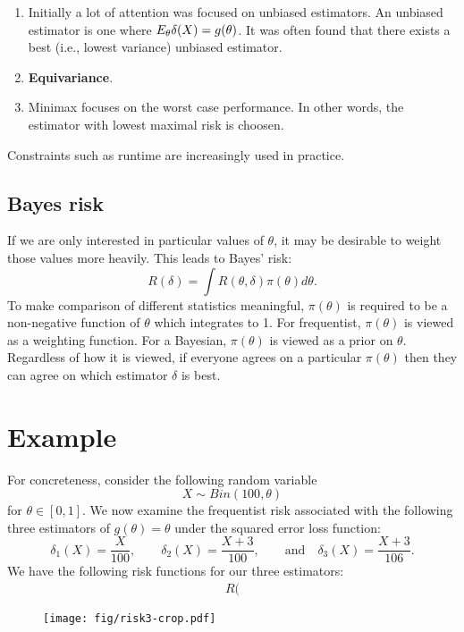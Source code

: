 \documentclass[twoside]{article}
\begin{document}
\begin{enumerate}
\item Initially a lot of attention was focused on unbiased estimators. An
  unbiased estimator is one where $E_{\theta}\delta(X) = g(\theta)$. It
  was often found that there exists a best (i.e., lowest variance) unbiased
  estimator.
\item \textbf{Equivariance}.
\item Minimax focuses on the worst case performance.  In other words, the estimator
   with lowest maximal risk is choosen.
\end{enumerate}

Constraints such as runtime are increasingly used in practice.

\subsection{Bayes risk}

If we are only interested in particular values of $\theta$, it may be desirable
to weight those values more heavily.  This leads to Bayes' risk:
\begin{equation}
R(\delta) = \int R(\theta, \delta) \pi(\theta) d\theta.
\end{equation}
To make comparison of different statistics meaningful, $\pi(\theta)$ is
required to be a non-negative function of $\theta$ which integrates to 1.  For
frequentist, $\pi(\theta)$ is viewed as a weighting function.  For a Bayesian,
$\pi(\theta)$ is viewed as a prior on $\theta$. Regardless of how it is viewed,
if everyone agrees on a particular $\pi(\theta)$ then they can agree on
which estimator $\delta$ is best.

\section{Example}

For concreteness, consider \citep[Example 3.1, p.~40-41]{keener} the following
random variable
\begin{equation*}
X \sim Bin(100, \theta)
\end{equation*}
for $\theta \in [0,1]$.  We now examine the frequentist risk associated with
the following three estimators of $g(\theta) = \theta$ under the squared error
loss function:
\begin{equation*}
\delta_1(X) = \frac{X}{100}, \qquad \delta_2(X) = \frac{X+3}{100},
              \qquad \text{and} \quad \delta_3(X) = \frac{X+3}{106}.
\end{equation*}
We have the following risk functions for our three estimators:
\begin{align*}
R(
\end{align*}

\begin{figure}[ht]
\centering
\texttt{[image: fig/risk3-crop.pdf]}
\caption{}
\label{fig:figure3}
\end{figure}



\end{document}
